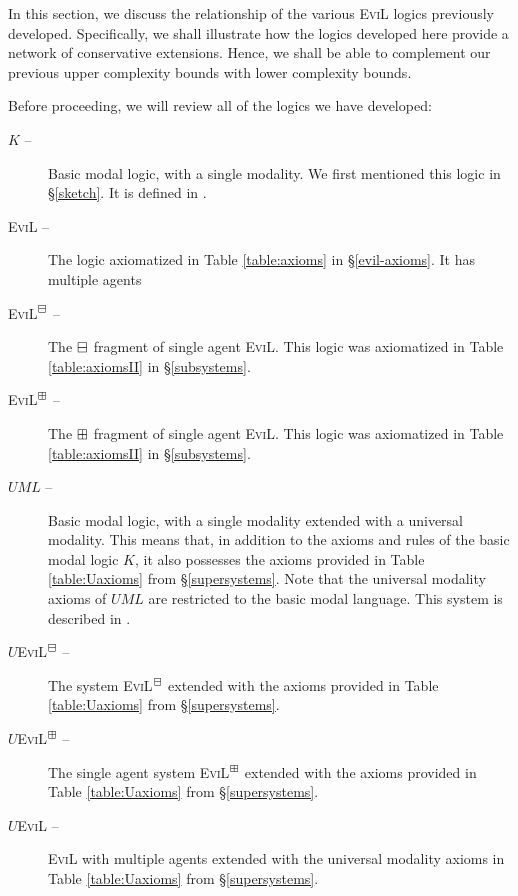 In this section, we discuss the relationship of the various
\textsc{EviL} logics previously developed.  Specifically, we shall
illustrate how the logics developed here provide a network of
conservative extensions.  Hence, we shall be able to complement our
previous upper complexity bounds with lower complexity bounds.

Before proceeding, we will review all of the logics we have developed:

\begin{definition}\label{all-logics}
\begin{description}
  \item[$K$ --] Basic modal logic, with a single modality. We first
    mentioned this logic in \S\ref{sketch}. It is defined in \cite[chapter 4,
    pg. 194]{blackburn_modal_2001}. 
\item[\textsc{EviL} --] The logic axiomatized in Table
  \ref{table:axioms} in \S\ref{evil-axioms}.  It has multiple agents
\item[\textsc{EviL}$^\boxminus$ --]  The $\boxminus$ fragment of single agent
  \textsc{EviL}.  This logic was axiomatized in Table
  \ref{table:axiomsII} in \S\ref{subsystems}.
\item[\textsc{EviL}$^\boxplus$ --]  The $\boxplus$ fragment of single agent
  \textsc{EviL}.  This logic was axiomatized in Table
  \ref{table:axiomsII} in \S\ref{subsystems}.
\item[$UML$ --] Basic modal logic, with a single modality extended
  with a universal modality.  This means that, in addition to the axioms and rules of the
  basic modal logic $K$, it also possesses the axioms provided in Table
  \ref{table:Uaxioms} from \S\ref{supersystems}.  Note that the
  universal modality axioms of $UML$ are restricted to the basic modal 
  language.  This system is  described in \cite[chapter 7.4]{van_benthem_modal_2010}.
\item[$U$\textsc{EviL}$^\boxminus$ --] The system \textsc{EviL}$^\boxminus$
  extended with the axioms provided in Table
  \ref{table:Uaxioms} from \S\ref{supersystems}.
\item[$U$\textsc{EviL}$^\boxplus$ --] The single agent system \textsc{EviL}$^\boxplus$
  extended with the axioms provided in Table
  \ref{table:Uaxioms} from \S\ref{supersystems}.
\item[$U$\textsc{EviL} --] \textsc{EviL}
  with multiple agents extended with the universal modality axioms in Table
  \ref{table:Uaxioms} from \S\ref{supersystems}.
\end{description}
\end{definition}

